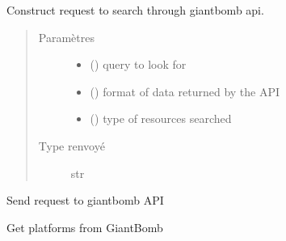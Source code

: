 \documentclass[letterpaper,10pt,french]{sphinxmanual}
\begin{document}
\begin{fulllineitems}
\label{\detokenize{scrapping:scrapping.construct_requests.construct_request}}
Construct request to search through giantbomb api.
\begin{quote}\begin{description}
\item[{Paramètres}] \leavevmode\begin{itemize}
\item {}
 () \textendash{} query to look for

\item {}
 () \textendash{} format of data returned by the API

\item {}
\sphinxstyleliteralstrong{\sphinxupquote{{[}}}\sphinxstyleliteralstrong{\sphinxupquote{{]} }} (\sphinxstyleliteralemphasis{\sphinxupquote{,}}) \textendash{} type of resources searched

\end{itemize}

\item[{Type renvoyé}] \leavevmode
str

\end{description}\end{quote}

\end{fulllineitems}

\label{\detokenize{scrapping:module-scrapping.send_requests}}
Send request to giantbomb API

\begin{fulllineitems}
\label{\detokenize{scrapping:scrapping.send_requests.get_platforms}}
Get platforms from GiantBomb

\end{fulllineitems}
\end{document}
